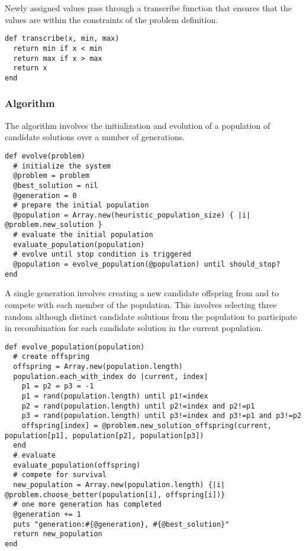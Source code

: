Newly assigned values pass through a transcribe function that ensures that the values are within the constraints of the problem definition.

\begin{lstlisting}
def transcribe(x, min, max)
  return min if x < min
  return max if x > max
  return x
end
\end{lstlisting}

\subsubsection{Algorithm}
The algorithm involves the initialization and evolution of a population of candidate solutions over a number of generations.

\begin{lstlisting}
def evolve(problem)
  # initialize the system
  @problem = problem
  @best_solution = nil
  @generation = 0
  # prepare the initial population
  @population = Array.new(heuristic_population_size) { |i| @problem.new_solution }
  # evaluate the initial population
  evaluate_population(population)
  # evolve until stop condition is triggered
  @population = evolve_population(@population) until should_stop?
end
\end{lstlisting}

A single generation involves creating a new candidate offspring from and to compete with each member of the population. This involves selecting three random although distinct candidate solutions from the population to participate in recombination for each candidate solution in the current population.

\begin{lstlisting}
def evolve_population(population)
  # create offspring
  offspring = Array.new(population.length)
  population.each_with_index do |current, index|
    p1 = p2 = p3 = -1
    p1 = rand(population.length) until p1!=index
    p2 = rand(population.length) until p2!=index and p2!=p1
    p3 = rand(population.length) until p3!=index and p3!=p1 and p3!=p2
    offspring[index] = @problem.new_solution_offspring(current, population[p1], population[p2], population[p3])
  end
  # evaluate
  evaluate_population(offspring)
  # compete for survival
  new_population = Array.new(population.length) {|i| @problem.choose_better(population[i], offspring[i])}
  # one more generation has completed
  @generation += 1
  puts "generation:#{@generation}, #{@best_solution}"    
  return new_population
end
\end{lstlisting}

